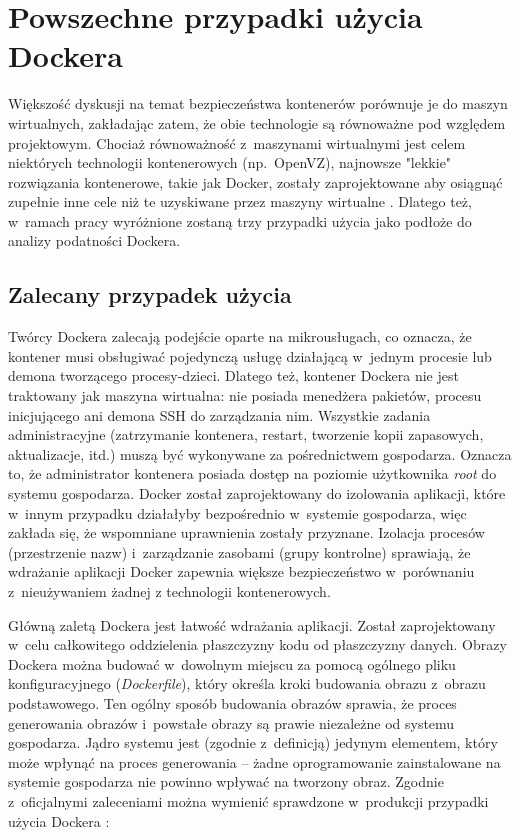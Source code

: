 \chapter{Powszechne przypadki użycia Dockera}

Większość dyskusji na temat bezpieczeństwa kontenerów porównuje je do maszyn wirtualnych, zakładając zatem, że obie technologie są równoważne pod względem projektowym. Chociaż równoważność z~maszynami wirtualnymi jest celem niektórych technologii kontenerowych (np.~OpenVZ), najnowsze "lekkie" rozwiązania kontenerowe, takie jak Docker, zostały zaprojektowane aby osiągnąć zupełnie inne cele niż te uzyskiwane przez maszyny wirtualne \cite{PetazzoniSSHDInDockerContainers}. Dlatego też, w~ramach pracy wyróżnione zostaną trzy przypadki użycia jako podłoże do analizy podatności Dockera.

\section{Zalecany przypadek użycia}

Twórcy Dockera zalecają podejście oparte na mikrousługach, co oznacza, że kontener musi obsługiwać pojedynczą usługę działającą w~jednym procesie lub demona tworzącego procesy-dzieci. Dlatego też, kontener Dockera nie jest traktowany jak maszyna wirtualna: nie posiada menedżera pakietów, procesu inicjującego ani demona SSH do zarządzania nim. Wszystkie zadania administracyjne (zatrzymanie kontenera, restart, tworzenie kopii zapasowych, aktualizacje, itd.) muszą być wykonywane za pośrednictwem gospodarza. Oznacza to, że administrator kontenera posiada dostęp na poziomie użytkownika \textit{root} do systemu gospodarza. Docker został zaprojektowany do izolowania aplikacji, które w~innym przypadku działałyby bezpośrednio w~systemie gospodarza, więc zakłada się, że wspomniane uprawnienia zostały przyznane. Izolacja procesów (przestrzenie nazw) i~zarządzanie zasobami (grupy kontrolne) sprawiają, że wdrażanie aplikacji Docker zapewnia większe bezpieczeństwo w~porównaniu z~nieużywaniem żadnej z technologii kontenerowych.

Główną zaletą Dockera jest łatwość wdrażania aplikacji. Został zaprojektowany w~celu całkowitego oddzielenia płaszczyzny kodu od płaszczyzny danych. Obrazy Dockera można budować w~dowolnym miejscu za pomocą ogólnego pliku konfiguracyjnego (\textit{Dockerfile}), który określa kroki budowania obrazu z~obrazu podstawowego. Ten ogólny sposób budowania obrazów sprawia, że proces generowania obrazów i~powstałe obrazy są prawie niezależne od systemu gospodarza. Jądro systemu jest (zgodnie z~definicją) jedynym elementem, który może wpłynąć na proces generowania -- żadne oprogramowanie zainstalowane na systemie gospodarza nie powinno wpływać na tworzony obraz. Zgodnie z~oficjalnymi zaleceniami można wymienić sprawdzone w~produkcji przypadki użycia Dockera \cite{SulemanRealWorldWaysToUseDocker}:

